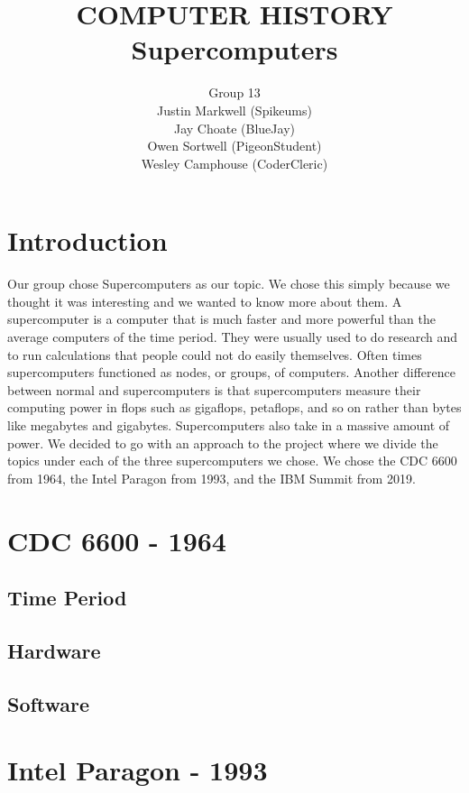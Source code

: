 \documentclass[letterpaper, 10 pt, conference]{IEEEconf}
\title{\LARGE \bf
COMPUTER HISTORY\\
\large Supercomputers
}
\author{Group 13\\
\small Justin Markwell (Spikeums)\\
\small Jay Choate (BlueJay)\\
\small Owen Sortwell (PigeonStudent)\\
\small Wesley Camphouse (CoderCleric)\\
}
\begin{document}
\maketitle
\thispagestyle{empty}
\pagestyle{empty}


\section{Introduction}

Our group chose Supercomputers as our topic. We chose this simply because we thought it was interesting and we wanted to know more about them. A supercomputer is a computer that is much faster and more powerful than the average computers of the time period. They were usually used to do research and to run calculations that people could not do easily themselves. Often times supercomputers functioned as nodes, or groups, of computers. Another difference between normal and supercomputers is that supercomputers measure their computing power in flops such as gigaflops, petaflops, and so on rather than bytes like megabytes and gigabytes. Supercomputers also take in a massive amount of power. We decided to go with an approach to the project where we divide the topics under each of the three supercomputers we chose. We chose the CDC 6600 from 1964, the Intel Paragon from 1993, and the IBM Summit from 2019. 

\section{CDC 6600 - 1964}
\subsection{Time Period}
\subsection{Hardware}
\subsection{Software}

\section{Intel Paragon - 1993}
\end{document}
